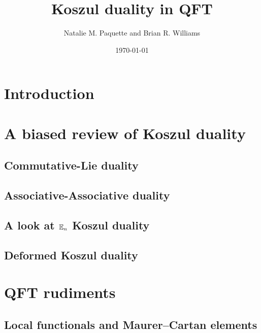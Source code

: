 \documentclass[11pt]{amsart}
\author{Natalie M. Paquette and Brian R. Williams}
\date{\today}
\title{Koszul duality in QFT}
\begin{document}
\maketitle


\section{Introduction}

\section{A biased review of Koszul duality} 


\subsection{Commutative-Lie duality}


\subsection{Associative-Associative duality} 


\subsection{A look at $\mathbb E_n$ Koszul duality}

\subsection{Deformed Koszul duality}

\section{QFT rudiments}


\subsection{Local functionals and Maurer--Cartan elements} 
\end{document}
